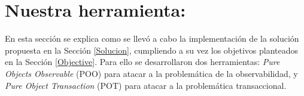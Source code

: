 \section{Nuestra herramienta: }
\label{Implementacion}

	En esta sección se explica como se llevó a cabo la implementación de la solución
	propuesta en la Sección \ref{Solucion}, cumpliendo a su vez los objetivos
	planteados en la Sección \ref{Objective}. Para ello se desarrollaron dos
	herramientas:
	\emph{Pure Objects Observable} (POO) para atacar a la problemática de la
	observabilidad, y \emph{Pure Object Transaction} (POT) para atacar a la
	problemática transaccional.





